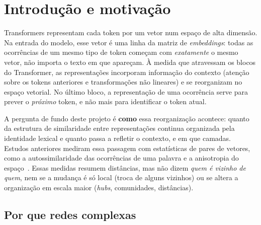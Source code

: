 \section{Introdução e motivação}\label{sec:introducao}

Transformers representam cada token por um vetor num espaço de alta dimensão. Na entrada do
modelo, esse vetor é uma linha da matriz de \emph{embeddings}: todas as ocorrências de um mesmo
tipo de token começam com \emph{exatamente} o mesmo vetor, não importa o texto em que
apareçam. À medida que atravessam os blocos do Transformer, as representações incorporam
informação do contexto (atenção sobre os tokens anteriores e transformações não lineares) e
se reorganizam no espaço vetorial. No último bloco, a representação de uma ocorrência serve
para prever o \emph{próximo} token, e não mais para identificar o token atual.

A pergunta de fundo deste projeto é \textbf{como} essa reorganização acontece: quanto da
estrutura de similaridade entre representações continua organizada pela identidade lexical e
quanto passa a refletir o contexto, e em que camadas. Estudos anteriores mediram essa
passagem com estatísticas de pares de vetores, como a autossimilaridade das ocorrências de uma
palavra e a anisotropia do espaço~\cite{ethayarajh2019}. Essas medidas resumem distâncias, mas
não dizem \emph{quem é vizinho de quem}, nem se a mudança é só local (troca de alguns vizinhos)
ou se altera a organização em escala maior (\emph{hubs}, comunidades, distâncias).

\subsection{Por que redes complexas}

